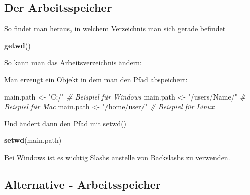 \documentclass[]{article}
\newenvironment{Shaded}{\begin{snugshade}}{\end{snugshade}}
\newcommand{\KeywordTok}[1]{\textcolor[rgb]{0.13,0.29,0.53}{\textbf{{#1}}}}
\newcommand{\StringTok}[1]{\textcolor[rgb]{0.31,0.60,0.02}{{#1}}}
\newcommand{\CommentTok}[1]{\textcolor[rgb]{0.56,0.35,0.01}{\textit{{#1}}}}
\newcommand{\NormalTok}[1]{{#1}}
\begin{document}
\subsection{Der Arbeitsspeicher}\label{der-arbeitsspeicher}

So findet man heraus, in welchem Verzeichnis man sich gerade befindet

\begin{Shaded}
\begin{Highlighting}[]
\KeywordTok{getwd}\NormalTok{()}
\end{Highlighting}
\end{Shaded}

So kann man das Arbeitsverzeichnis ändern:

Man erzeugt ein Objekt in dem man den Pfad abspeichert:

\begin{Shaded}
\begin{Highlighting}[]
\NormalTok{main.path <-}\StringTok{ "C:/"} \CommentTok{# Beispiel für Windows}
\NormalTok{main.path <-}\StringTok{ "/users/Name/"} \CommentTok{# Beispiel für Mac}
\NormalTok{main.path <-}\StringTok{ "/home/user/"} \CommentTok{# Beispiel für Linux}
\end{Highlighting}
\end{Shaded}

Und ändert dann den Pfad mit setwd()

\begin{Shaded}
\begin{Highlighting}[]
\KeywordTok{setwd}\NormalTok{(main.path)}
\end{Highlighting}
\end{Shaded}

Bei Windows ist es wichtig Slashs anstelle von Backslashs zu verwenden.

\subsection{Alternative -
Arbeitsspeicher}\label{alternative---arbeitsspeicher}
\end{document}
